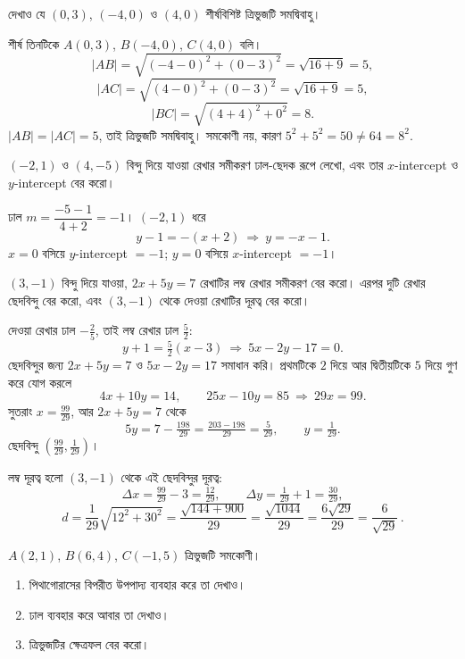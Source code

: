 \documentclass[11pt]{article}
\begin{document}
 দেখাও যে $(0, 3)$, $(-4, 0)$ ও $(4, 0)$ শীর্ষবিশিষ্ট ত্রিভুজটি
সমদ্বিবাহু।

\begin{sol}
শীর্ষ তিনটিকে $A(0,3)$, $B(-4,0)$, $C(4,0)$ বলি।
\[
  |AB| = \sqrt{(-4-0)^2 + (0-3)^2} = \sqrt{16+9} = 5 ,
\]
\[
  |AC| = \sqrt{(4-0)^2 + (0-3)^2} = \sqrt{16+9} = 5 ,
\]
\[
  |BC| = \sqrt{(4+4)^2 + 0^2} = 8 .
\]
$|AB| = |AC| = 5$, তাই ত্রিভুজটি সমদ্বিবাহু। সমকোণী নয়, কারণ
$5^2 + 5^2 = 50 \neq 64 = 8^2$.
\end{sol}

 $(-2, 1)$ ও $(4, -5)$ বিন্দু দিয়ে যাওয়া রেখার সমীকরণ ঢাল-ছেদক রূপে
লেখো, এবং তার $x$-intercept ও $y$-intercept বের করো।

\begin{sol}
ঢাল $m = \dfrac{-5-1}{4+2} = -1$। $(-2,1)$ ধরে
\[
  y - 1 = -(x + 2) \ \Longrightarrow\ y = -x - 1 .
\]
$x = 0$ বসিয়ে $y$-intercept $= -1$; $y = 0$ বসিয়ে $x$-intercept $= -1$।
\end{sol}

 $(3, -1)$ বিন্দু দিয়ে যাওয়া, $2x + 5y = 7$ রেখাটির লম্ব রেখার
সমীকরণ বের করো। এরপর দুটি রেখার ছেদবিন্দু বের করো, এবং $(3,-1)$ থেকে দেওয়া
রেখাটির দূরত্ব বের করো।

\begin{sol}
দেওয়া রেখার ঢাল $-\tfrac{2}{5}$, তাই লম্ব রেখার ঢাল $\tfrac{5}{2}$:
\[
  y + 1 = \tfrac{5}{2}(x - 3) \ \Longrightarrow\ 5x - 2y - 17 = 0 .
\]
ছেদবিন্দুর জন্য $2x + 5y = 7$ ও $5x - 2y = 17$ সমাধান করি। প্রথমটিকে $2$ দিয়ে
আর দ্বিতীয়টিকে $5$ দিয়ে গুণ করে যোগ করলে
\[
  4x + 10y = 14, \qquad 25x - 10y = 85
  \ \Longrightarrow\ 29x = 99 .
\]
সুতরাং $x = \tfrac{99}{29}$, আর $2x + 5y = 7$ থেকে
\[
  5y = 7 - \tfrac{198}{29} = \tfrac{203 - 198}{29} = \tfrac{5}{29},
  \qquad y = \tfrac{1}{29}.
\]
ছেদবিন্দু $\left( \tfrac{99}{29}, \tfrac{1}{29} \right)$।

লম্ব দূরত্ব হলো $(3,-1)$ থেকে এই ছেদবিন্দুর দূরত্ব:
\[
  \Delta x = \tfrac{99}{29} - 3 = \tfrac{12}{29}, \qquad
  \Delta y = \tfrac{1}{29} + 1 = \tfrac{30}{29},
\]
\[
  d = \frac{1}{29}\sqrt{12^2 + 30^2} = \frac{\sqrt{144 + 900}}{29}
    = \frac{\sqrt{1044}}{29} = \frac{6\sqrt{29}}{29} = \frac{6}{\sqrt{29}}\,.
\]
\end{sol}

 $A(2, 1)$, $B(6, 4)$, $C(-1, 5)$ ত্রিভুজটি সমকোণী।
\begin{enumerate}
  \item পিথাগোরাসের বিপরীত উপপাদ্য ব্যবহার করে তা দেখাও।
  \item ঢাল ব্যবহার করে আবার তা দেখাও।
  \item ত্রিভুজটির ক্ষেত্রফল বের করো।
\end{enumerate}
\end{document}
